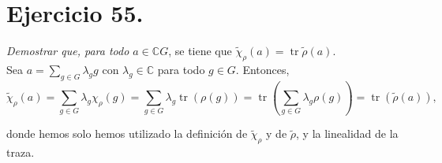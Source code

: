 \section{Ejercicio 55.}
\textit{Demostrar que, para todo \(a \in \mathbb{C}G\)}, se tiene que \(\tilde{\chi}_{\rho}(a) = \operatorname{tr} \tilde{\rho} (a)\). \\

Sea \(a = \sum_{g \in G} \lambda_g g \) con \(\lambda_g \in \mathbb{C}\) para todo \(g \in G\). Entonces,
\[
\tilde{\chi}_{\rho}(a) = \sum_{g \in G} \lambda_g \chi_{\rho}(g) = \sum_{g \in G} \lambda_g \operatorname{tr}(\rho(g)) = \operatorname{tr} (\sum_{g \in G} \lambda_g \rho (g)) = \operatorname{tr} (\tilde{\rho}(a))
,\]

donde hemos solo hemos utilizado la definición de \(\tilde{\chi}_{\rho}\) y de \(\tilde{\rho}\), y la linealidad de la traza.
